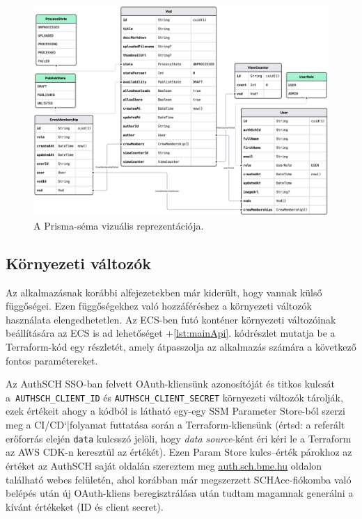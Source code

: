 \begin{figure}[h]
  \centering
  \includegraphics[width=150mm, keepaspectratio]{figures/prismaliser.png}
  \caption{A Prisma-séma vizuális reprezentációja.}
  \label{fig:prismaliser}
\end{figure}

\subsection{Környezeti változók}\label{sec:envvars}

Az alkalmazásnak korábbi alfejezetekben már kiderült, hogy vannak külső függőségei. Ezen függőségekhez való hozzáféréshez a környezeti változók használata elengedhetetlen. Az ECS-ben futó konténer környezeti változóinak beállítására az ECS is ad lehetőséget \az+\ref{lst:mainApi}. kódrészlet mutatja be a Terraform-kód egy részletét, amely átpasszolja az alkalmazás számára a következő fontos paramétereket.

Az AuthSCH SSO-ban felvett OAuth-kliensünk\cite{ietf-oauth-security-topics-13} azonosítóját és titkos kulcsát a~\verb|AUTHSCH_CLIENT_ID| és \verb|AUTHSCH_CLIENT_SECRET| környezeti változók tárolják, ezek értékeit ahogy a kódból is látható egy-egy SSM Parameter Store-ból szerzi meg a CI/CD`|folyamat futtatása során a Terraform-kliensünk (értsd: a referált erőforrás elején \verb|data| kulcsszó jelöli, hogy \emph{data source}-ként éri kéri le a Terraform az AWS CDK-n keresztül az értékét). Ezen Param Store kulcs--érték párokhoz az értéket az AuthSCH saját oldalán szereztem meg \url{auth.sch.bme.hu} oldalon található webes felületén, ahol korábban már megszerzett SCHAcc-fiókomba való belépés után új OAuth-kliens beregisztrálása után tudtam magamnak generálni a kívánt értékeket (ID és client secret).

